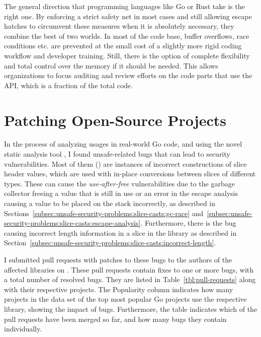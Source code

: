 The general direction that programming languages like Go or Rust take is the right one.
By enforcing a strict safety net in most cases and still allowing escape hatches to circumvent these measures when it is
absolutely necessary, they combine the best of two worlds.
In most of the code base, buffer overflows, race conditions etc. are prevented at the small cost of a slightly more
rigid coding workflow and developer training.
Still, there is the option of complete flexibility and total control over the memory if it should be needed.
This allows organizations to focus auditing and review efforts on the code parts that use the \unsafe{} \acrshort{API},
which is a fraction of the total code.



\section{Patching Open-Source Projects}\label{sec:discussion:patches}

In the process of analyzing \unsafe{} usages in real-world Go code, and using the novel static analysis tool
\toolSafer{}, I found \numberBugsFixed{} unsafe-related bugs that can lead to security vulnerabilities.
Most of them () are instances of incorrect constructions of slice header values, which are used with
in-place conversions between slices of different types.
These can cause the \textit{use-after-free} vulnerabilities due to the garbage collector freeing a value that is still
in use or an error in the escape analysis causing a value to be placed on the stack incorrectly, as described in
Sections~\ref{subsec:unsafe-security-problems:slice-casts:gc-race}
and~\ref{subsec:unsafe-security-problems:slice-casts:escape-analysis}.
Furthermore, there is the bug causing incorrect length information in a slice in the \goFuse{} library as described in
Section~\ref{subsec:unsafe-security-problems:slice-casts:incorrect-length}.

I submitted \numberPRs{} pull requests with patches to these bugs to the authors of the affected libraries on
\github{}.
These pull requests contain fixes to one or more bugs, with a total number of \numberBugsFixed{} resolved bugs.
They are listed in Table~\ref{tbl:pull-requests} along with their respective \github{} projects.
The Popularity column indicates how many projects in the data set of the top \projsTotal{} most popular Go projects use
the respective library, showing the impact of bugs.
Furthermore, the table indicates which of the pull requests have been merged so far, and how many bugs they contain
individually.

